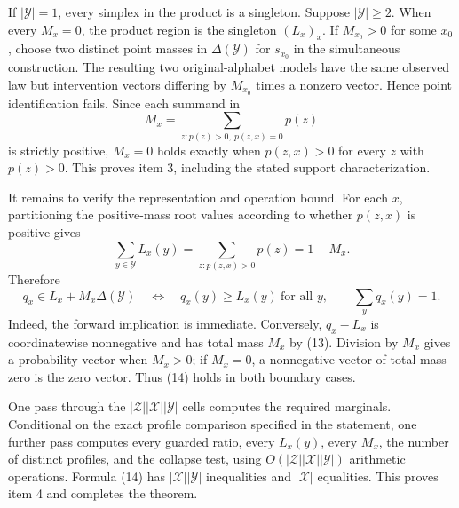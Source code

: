 If \(\lvert\mathcal Y\rvert=1\), every simplex in the product is a
singleton.  Suppose \(\lvert\mathcal Y\rvert\geq2\).  When every
\(M_x=0\), the product region is the singleton \((L_x)_x\).  If
\(M_{x_0}>0\) for some \(x_0\), choose two distinct point masses in
\(\Delta(\mathcal Y)\) for \(s_{x_0}\) in the simultaneous construction.
The resulting two original-alphabet models have the same observed law
but intervention vectors differing by \(M_{x_0}\) times a nonzero
vector.  Hence point identification fails.  Since each summand in
\[
 M_x=\sum_{z:p(z)>0,\ p(z,x)=0}p(z)
\]
is strictly positive, \(M_x=0\) holds exactly when
\(p(z,x)>0\) for every \(z\) with \(p(z)>0\).  This proves item 3,
including the stated support characterization.

It remains to verify the representation and operation bound.  For each
\(x\), partitioning the positive-mass root values according to whether
\(p(z,x)\) is positive gives
\[
 \sum_{y\in\mathcal Y}L_x(y)
 =\sum_{z:p(z,x)>0}p(z)=1-M_x.
\tag{13}
\]
Therefore
\[
 q_x\in L_x+M_x\Delta(\mathcal Y)
 \quad\Longleftrightarrow\quad
 q_x(y)\geq L_x(y)\ \text{for all }y,
 \qquad \sum_yq_x(y)=1.
\tag{14}
\]
Indeed, the forward implication is immediate.  Conversely,
\(q_x-L_x\) is coordinatewise nonnegative and has total mass \(M_x\)
by (13).  Division by \(M_x\) gives a probability vector when
\(M_x>0\); if \(M_x=0\), a nonnegative vector of total mass zero is the
zero vector.  Thus (14) holds in both boundary cases.

One pass through the
\(\lvert\mathcal Z\rvert\lvert\mathcal X\rvert
\lvert\mathcal Y\rvert\) cells computes the required marginals.
Conditional on the exact profile comparison specified in the statement,
one further pass computes every guarded ratio, every \(L_x(y)\), every
\(M_x\), the number of distinct profiles, and the collapse test, using
\(O(\lvert\mathcal Z\rvert\lvert\mathcal X\rvert
\lvert\mathcal Y\rvert)\) arithmetic operations.  Formula (14) has
\(\lvert\mathcal X\rvert\lvert\mathcal Y\rvert\) inequalities and
\(\lvert\mathcal X\rvert\) equalities.  This proves item 4 and completes
the theorem.
